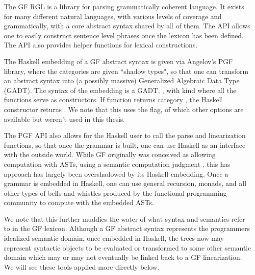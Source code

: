 The GF RGL is a library for parsing grammatically coherent language. It exists
for many different natural languages, with various levels of coverage and
grammatically, with a core abstract syntax shared by all of them. The API allows
one to easily construct sentence level phrases once the lexicon has been
defined. The API also provides helper functions for lexical constructions.

The Haskell embedding of a GF abstract syntax is given via Angelov's PGF
library, where the categories are given ``shadow types", so that one can
transform an abstract syntax into (a possibly massive) Generalized Algebraic
Data Type (GADT). The syntax of the embedding is a GADT, , with kind
\codeword{* -> *} where all the functions serve as constructors. If function
 returns category , the Haskell constructor
 returns . We note that this uses the
 flag, of which other options are available but weren't
used in this thesis.

The PGF API also allows for the Haskell user to call the parse and linearization
functions, so that once the grammar is built, one can use Haskell as an
interface with the outside world. While GF originally was conceived as allowing
computation with ASTs, using a semantic computation judgment , this
has approach has largely been overshadowed by its Haskell embedding. Once a
grammar is embedded in Haskell, one can use general recursion, monads, and all
other types of bells and whistles produced by the functional programming
community to compute with the embedded ASTs.

We note that this further muddies the water of what syntax and semantics refer
to in the GF lexicon. Although a GF abstract syntax represents the
programmers idealized semantic domain, once embedded in Haskell, the trees now may
represent syntactic objects to be evaluated or transformed to some other
semantic domain which may or may not eventually be linked back to a GF
linearization. We will see these tools applied more directly below.



